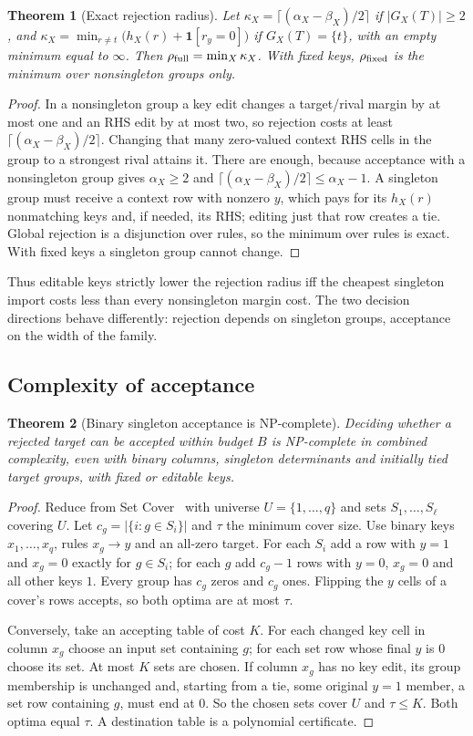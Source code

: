 \documentclass[11pt]{article}
\newtheorem{theorem}{Theorem}
\theoremstyle{remark}
\newcommand{\ind}{\mathbf{1}}
\newcommand{\INF}{\infty}
\newcommand{\rfull}{\rho_{\rm full}}
\newcommand{\rfix}{\rho_{\rm fixed}}
\begin{document}
\begin{theorem}[Exact rejection radius]\label{thm:reject}
Let $\kappa_X=\lceil(\alpha_X-\beta_X)/2\rceil$ if $|G_X(T)|\ge2$, and
$\kappa_X=\min_{r\ne t}\bigl(h_X(r)+\ind[r_y=0]\bigr)$ if $G_X(T)=\{t\}$, with an
empty minimum equal to $\INF$. Then $\rfull=\min_X\kappa_X$. With fixed keys,
$\rfix$ is the minimum over nonsingleton groups only.
\end{theorem}
\begin{proof}
In a nonsingleton group a key edit changes a target/rival margin by at most one
and an RHS edit by at most two, so rejection costs at least
$\lceil(\alpha_X-\beta_X)/2\rceil$. Changing that many zero-valued context RHS cells in
the group to a strongest rival attains it. There are enough, because
acceptance with a nonsingleton group gives $\alpha_X\ge2$ and
$\lceil(\alpha_X-\beta_X)/2\rceil\le \alpha_X-1$. A singleton group must receive a context
row with nonzero $y$, which pays for its $h_X(r)$ nonmatching keys and, if
needed, its RHS; editing just that row creates a tie. Global rejection is a
disjunction over rules, so the minimum over rules is exact. With fixed keys a
singleton group cannot change.
\end{proof}

Thus editable keys strictly lower the rejection radius iff the cheapest
singleton import costs less than every nonsingleton margin cost. The two
decision directions behave differently: rejection depends on singleton groups,
acceptance on the width of the family.

\subsection{Complexity of acceptance}
\begin{theorem}[Binary singleton acceptance is NP-complete]\label{thm:hardness}
Deciding whether a rejected target can be accepted within budget $B$ is
NP-complete in combined complexity, even with binary columns, singleton
determinants and initially tied target groups, with fixed or editable keys.
\end{theorem}
\begin{proof}
Reduce from Set Cover~\cite{karp} with universe $U=\{1,\ldots,q\}$ and sets
$S_1,\ldots,S_\ell$ covering $U$. Let $c_g=|\{i:g\in S_i\}|$ and $\tau$ the
minimum cover size. Use binary keys $x_1,\ldots,x_q$, rules $x_g\to y$ and an
all-zero target. For each $S_i$ add a row with $y=1$ and $x_g=0$ exactly for
$g\in S_i$; for each $g$ add $c_g-1$ rows with $y=0$, $x_g=0$ and all other
keys $1$. Every group has $c_g$ zeros and $c_g$ ones. Flipping the $y$ cells of
a cover's rows accepts, so both optima are at most $\tau$.

Conversely, take an accepting table of cost $K$. For each changed key cell in
column $x_g$ choose an input set containing $g$; for each set row whose final
$y$ is $0$ choose its set. At most $K$ sets are chosen. If column $x_g$ has no
key edit, its group membership is unchanged and, starting from a tie, some
original $y=1$ member, a set row containing $g$, must end at $0$. So the
chosen sets cover $U$ and $\tau\le K$. Both optima equal $\tau$. A destination
table is a polynomial certificate.
\end{proof}
\end{document}
